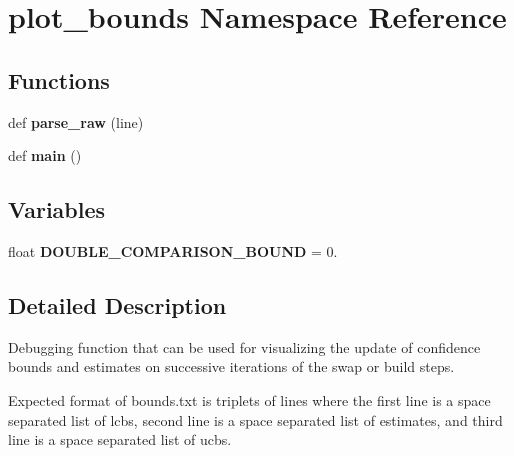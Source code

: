 \hypertarget{namespaceplot__bounds}{}\section{plot\+\_\+bounds Namespace Reference}
\label{namespaceplot__bounds}
\subsection*{Functions}
\begin{DoxyCompactItemize}
\item 
\mbox{\label{namespaceplot__bounds_ac78069168802017a34886cb878677a11}} 
def {\bfseries parse\+\_\+raw} (line)
\item 
\mbox{\label{namespaceplot__bounds_a7db73f58ffb92b6ccec7690746dd6bf5}} 
def {\bfseries main} ()
\end{DoxyCompactItemize}
\subsection*{Variables}
\begin{DoxyCompactItemize}
\item 
\mbox{\label{namespaceplot__bounds_a0189a49cb7cb8a489396be1299bd0170}} 
float {\bfseries D\+O\+U\+B\+L\+E\+\_\+\+C\+O\+M\+P\+A\+R\+I\+S\+O\+N\+\_\+\+B\+O\+U\+ND} = 0.
\end{DoxyCompactItemize}


\subsection{Detailed Description}
\begin{DoxyVerb}Debugging function that can be used for visualizing the update of
confidence bounds and estimates on successive iterations of the swap
or build steps.

Expected format of bounds.txt is triplets of lines where the first line
is a space separated list of lcbs, second line is a space separated list
of estimates, and third line is a space separated list of ucbs.
\end{DoxyVerb}
 